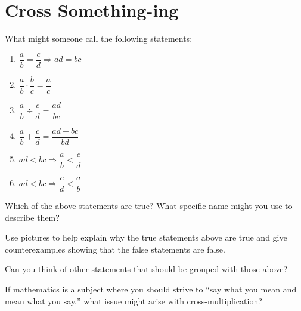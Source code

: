 \newpage
\section{Cross Something-ing}\label{A:CrossSomething}


\begin{prob} 
What might someone call the following statements:
\begin{enumerate}
\item $\dfrac{a}{b} = \dfrac{c}{d} \Rightarrow ad = bc$
\item $\dfrac{a}{b}\cdot \dfrac{b}{c} = \dfrac{a}{c}$
\item $\dfrac{a}{b}\div \dfrac{c}{d} = \dfrac{ad}{bc}$
\item $\dfrac{a}{b} +\dfrac{c}{d} = \dfrac{ad+bc}{bd}$
\item $ad < bc \Rightarrow \dfrac{a}{b} < \dfrac{c}{d}$
\item $ad < bc \Rightarrow \dfrac{c}{d} < \dfrac{a}{b}$
\end{enumerate}
\end{prob}

\begin{prob}
Which of the above statements are true? What specific name might you
use to describe them?
\end{prob}

\begin{prob} 
Use pictures to help explain why the true statements above are true
and give counterexamples showing that the false statements are false.
\end{prob}


\begin{prob} 
Can you think of other statements that should be grouped with those
above?
\end{prob}

\begin{prob}
If mathematics is a subject where you should strive to ``say what you
mean and mean what you say,'' what issue might arise with
cross-multiplication?
\end{prob}


